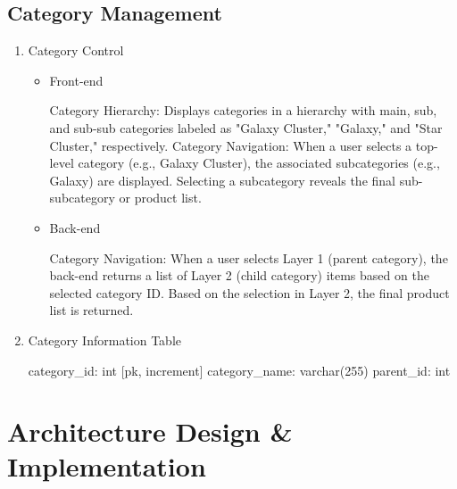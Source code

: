\documentclass[conference]{IEEEtran}
\begin{document}
\subsection{Category Management}

\begin{enumerate}
\setlength{\parindent}{2ex}
\item Category Control
\begin{itemize}
\setlength{\parindent}{2ex}
\item Front-end

Category Hierarchy: Displays categories in a hierarchy with main, sub, and sub-sub categories labeled as "Galaxy Cluster," "Galaxy," and "Star Cluster," respectively. \newline\hspace*{1.2ex}
Category Navigation: When a user selects a top-level category (e.g., Galaxy Cluster), the associated subcategories (e.g., Galaxy) are displayed. Selecting a subcategory reveals the final sub-subcategory or product list.

\item Back-end

Category Navigation: When a user selects Layer 1 (parent category), the back-end returns a list of Layer 2 (child category) items based on the selected category ID. Based on the selection in Layer 2, the final product list is returned.

\end{itemize}

\item Category Information Table

category\_id: int [pk, increment] \newline\hspace*{1.2ex}
category\_name: varchar(255) \newline\hspace*{1.2ex}        
parent\_id: int \newline\hspace*{1.2ex}

\hspace{0.5em}{\scriptsize Table attribute can be changed in development.}

\end{enumerate}

\section{Architecture Design \& Implementation}
\end{document}
